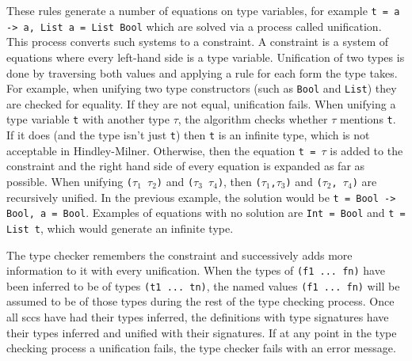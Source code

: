 These rules generate a number of equations on type variables, for example \texttt{t = a -> a, List a = List Bool} which are solved via a process called \gls{unification}. This process converts such systems to a \gls{constraint}. A constraint is a system of equations where every left-hand side is a type variable. Unification of two types is done by traversing both values and applying a rule for each form the type takes. For example, when unifying two type constructors (such as \texttt{Bool} and \texttt{List}) they are checked for equality. If they are not equal, unification fails. When unifying a type variable \texttt{t} with another type \texttt{$\tau$}, the algorithm checks whether \texttt{$\tau$} mentions \texttt{t}. If it does (and the type isn't just \texttt{t}) then \texttt{t} is an infinite type, which is not acceptable in Hindley-Milner. Otherwise, then the equation \texttt{t = $\tau$} is added to the constraint and the right hand side of every equation is expanded as far as possible. When unifying \texttt{($\tau_1$ $\tau_2$)} and \texttt{($\tau_3$ $\tau_4$)}, then \texttt{($\tau_1$,$\tau_3$)} and \texttt{($\tau_2$, $\tau_4$)} are recursively unified.  In the previous example, the solution would be \texttt{t = Bool -> Bool, a = Bool}. Examples of equations with no solution are \texttt{Int = Bool} and \texttt{t = List t}, which would generate an infinite type. 

The type checker remembers the constraint and successively adds more information to it with every unification.
When the types of \texttt{(f1 ... fn)} have been inferred to be of types \texttt{(t1 ... tn)}, the named values \texttt{(f1 ... fn)} will be assumed to be of those types during the rest of the type checking process. Once all \glspl{scc} have had their types inferred, the definitions with type signatures have their types inferred and unified with their signatures. If at any point in the type checking process a \gls{unification} fails, the type checker fails with an error message.




